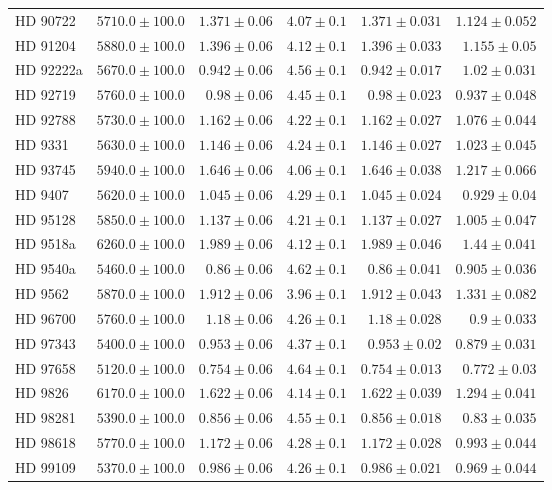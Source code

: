 \begin{longtable*}{lrrrrr}
HD 90722 & $5710.0\pm 100.0$ & $1.371\pm 0.06$ & $4.07\pm 0.1$ & $1.371\pm 0.031$ & $1.124\pm 0.052$ \\ 
HD 91204 & $5880.0\pm 100.0$ & $1.396\pm 0.06$ & $4.12\pm 0.1$ & $1.396\pm 0.033$ & $1.155\pm 0.05$ \\ 
HD 92222a & $5670.0\pm 100.0$ & $0.942\pm 0.06$ & $4.56\pm 0.1$ & $0.942\pm 0.017$ & $1.02\pm 0.031$ \\ 
HD 92719 & $5760.0\pm 100.0$ & $0.98\pm 0.06$ & $4.45\pm 0.1$ & $0.98\pm 0.023$ & $0.937\pm 0.048$ \\ 
HD 92788 & $5730.0\pm 100.0$ & $1.162\pm 0.06$ & $4.22\pm 0.1$ & $1.162\pm 0.027$ & $1.076\pm 0.044$ \\ 
HD 9331 & $5630.0\pm 100.0$ & $1.146\pm 0.06$ & $4.24\pm 0.1$ & $1.146\pm 0.027$ & $1.023\pm 0.045$ \\ 
HD 93745 & $5940.0\pm 100.0$ & $1.646\pm 0.06$ & $4.06\pm 0.1$ & $1.646\pm 0.038$ & $1.217\pm 0.066$ \\ 
HD 9407 & $5620.0\pm 100.0$ & $1.045\pm 0.06$ & $4.29\pm 0.1$ & $1.045\pm 0.024$ & $0.929\pm 0.04$ \\ 
HD 95128 & $5850.0\pm 100.0$ & $1.137\pm 0.06$ & $4.21\pm 0.1$ & $1.137\pm 0.027$ & $1.005\pm 0.047$ \\ 
HD 9518a & $6260.0\pm 100.0$ & $1.989\pm 0.06$ & $4.12\pm 0.1$ & $1.989\pm 0.046$ & $1.44\pm 0.041$ \\ 
HD 9540a & $5460.0\pm 100.0$ & $0.86\pm 0.06$ & $4.62\pm 0.1$ & $0.86\pm 0.041$ & $0.905\pm 0.036$ \\ 
HD 9562 & $5870.0\pm 100.0$ & $1.912\pm 0.06$ & $3.96\pm 0.1$ & $1.912\pm 0.043$ & $1.331\pm 0.082$ \\ 
HD 96700 & $5760.0\pm 100.0$ & $1.18\pm 0.06$ & $4.26\pm 0.1$ & $1.18\pm 0.028$ & $0.9\pm 0.033$ \\ 
HD 97343 & $5400.0\pm 100.0$ & $0.953\pm 0.06$ & $4.37\pm 0.1$ & $0.953\pm 0.02$ & $0.879\pm 0.031$ \\ 
HD 97658 & $5120.0\pm 100.0$ & $0.754\pm 0.06$ & $4.64\pm 0.1$ & $0.754\pm 0.013$ & $0.772\pm 0.03$ \\ 
HD 9826 & $6170.0\pm 100.0$ & $1.622\pm 0.06$ & $4.14\pm 0.1$ & $1.622\pm 0.039$ & $1.294\pm 0.041$ \\ 
HD 98281 & $5390.0\pm 100.0$ & $0.856\pm 0.06$ & $4.55\pm 0.1$ & $0.856\pm 0.018$ & $0.83\pm 0.035$ \\ 
HD 98618 & $5770.0\pm 100.0$ & $1.172\pm 0.06$ & $4.28\pm 0.1$ & $1.172\pm 0.028$ & $0.993\pm 0.044$ \\ 
HD 99109 & $5370.0\pm 100.0$ & $0.986\pm 0.06$ & $4.26\pm 0.1$ & $0.986\pm 0.021$ & $0.969\pm 0.044$ \\ 

\end{longtable*}
